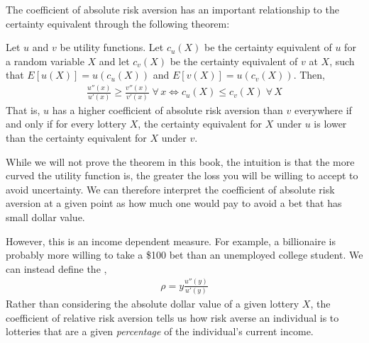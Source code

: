 The coefficient of absolute risk aversion has an important relationship to the certainty equivalent through the following theorem:

\begin{theorem*}
    Let $u$ and $v$ be utility functions. Let $c_u(X)$ be the certainty equivalent of $u$ for a random variable $X$ and let $c_v(X)$ be the certainty equivalent of $v$ at $X$, such that $E[u(X)] = u(c_u(X))$ and $E[v(X)] = u(c_v(X))$. Then,
    \begin{align*}
        \frac{u''(x)}{u'(x)} \geq \frac{v''(x)}{v'(x)} \; \forall \, x \iff c_u(X) \leq c_v(X) \; \forall \, X
    \end{align*}
    That is, $u$ has a higher coefficient of absolute risk aversion than $v$ everywhere if and only if for every lottery $X$, the certainty equivalent for $X$ under $u$ is lower than the certainty equivalent for $X$ under $v$. 
\end{theorem*}

While we will not prove the theorem in this book, the intuition is that the more curved the utility function is, the greater the loss you will be willing to accept to avoid uncertainty. We can therefore interpret the coefficient of absolute risk aversion at a given point as how much one would pay to avoid a bet that has small dollar value.

However, this is an income dependent measure. For example, a billionaire is probably more willing to take a \$100 bet than an unemployed college student. We can instead define the , 
\begin{align*}
    \rho = y \frac{u''(y)}{u'(y)}
\end{align*}
Rather than considering the absolute dollar value of a given lottery $X$, the coefficient of relative risk aversion tells us how risk averse an individual is to lotteries that are a given \emph{percentage} of the individual's current income.